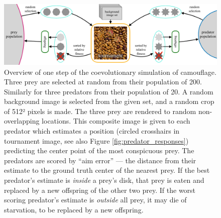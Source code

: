 \documentclass[acmtog]{acmart}
\begin{document}
\begin{figure}
    \includegraphics[width=\textwidth]{coc_overview.pdf}
    \caption{Overview of one step of the coevolutionary simulation of camouflage. Three prey are selected at random from their population of 200. Similarly for three predators from their population of 20. A random background image is selected from the given set, and a random crop of 512² pixels is made. The three prey are rendered to random non-overlapping locations. This composite image is given to each predator which estimates a position (circled crosshairs in tournament image, see also Figure \ref{fig:predator_responses}) predicting the center point of the most conspicuous prey. The predators are scored by “aim error” — the distance from their estimate to the ground truth center of the nearest prey. If the best predator's estimate is \textit{inside} a prey's disk, that prey is eaten and replaced by a new offspring of the other two prey. If the worst scoring predator's estimate is \textit{outside} all prey, it may die of starvation, to be replaced by a new offspring.}
    \label{fig:simulation_overview}
\end{figure}

\end{document}
